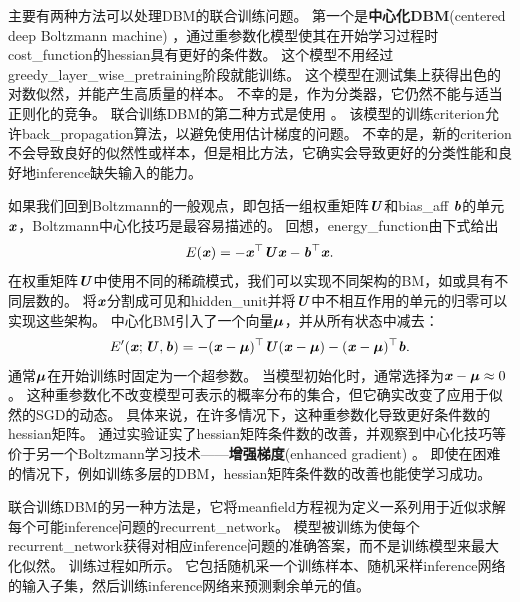 
主要有两种方法可以处理\gls{DBM}的联合训练问题。
第一个是\textbf{中心化\gls{DBM}}(centered deep Boltzmann machine) \citep{Montavon2012}，通过重参数化模型使其在开始学习过程时\gls{cost_function}的\gls{hessian}具有更好的条件数。
这个模型不用经过\gls{greedy_layer_wise_pretraining}阶段就能训练。
这个模型在测试集上获得出色的对数似然，并能产生高质量的样本。
不幸的是，作为分类器，它仍然不能与适当正则化的竞争。
联合训练\gls{DBM}的第二种方式是使用 \citep{Goodfellow-et-al-NIPS2013}。
该模型的训练\gls{criterion}允许\gls{back_propagation}算法，以避免使用估计梯度的问题。
不幸的是，新的\gls{criterion}不会导致良好的似然性或样本，但是相比方法，它确实会导致更好的分类性能和良好地\gls{inference}缺失输入的能力。

如果我们回到\gls{Boltzmann}的一般观点，即包括一组权重矩阵$\boldsymbol{\mathit{U}}$和\gls{bias_aff} $\boldsymbol{\mathit{b}}$的单元$\boldsymbol{\mathit{x}}$，\gls{Boltzmann}中心化技巧是最容易描述的。
回想，\gls{energy_function}由下式给出
\begin{align}
 E(\boldsymbol{\mathit{x}}) = -\boldsymbol{\mathit{x}}^\top \boldsymbol{\mathit{U}} \boldsymbol{\mathit{x}} - \boldsymbol{\mathit{b}}^\top \boldsymbol{\mathit{x}}.
\end{align}
在权重矩阵$\boldsymbol{\mathit{U}}$中使用不同的稀疏模式，我们可以实现不同架构的\gls{BM}，如或具有不同层数的。
将$\boldsymbol{\mathit{x}}$分割成可见和\gls{hidden_unit}并将$\boldsymbol{\mathit{U}}$中不相互作用的单元的归零可以实现这些架构。
中心化\gls{BM}引入了一个向量$\boldsymbol{\mu}$，并从所有状态中减去：
\begin{align}
    E^{\prime}(\boldsymbol{\mathit{x}}; \boldsymbol{\mathit{U}}, \boldsymbol{\mathit{b}}) = -(\boldsymbol{\mathit{x}} - \boldsymbol{\mu})^\top \boldsymbol{\mathit{U}} (\boldsymbol{\mathit{x}} - \boldsymbol{\mu}) - (\boldsymbol{\mathit{x}} - \boldsymbol{\mu})^\top \boldsymbol{\mathit{b}}.
\end{align}
通常$\boldsymbol{\mu}$在开始训练时固定为一个超参数。
当模型初始化时，通常选择为$\boldsymbol{\mathit{x}} - \boldsymbol{\mu} \approx 0$。
这种重参数化不改变模型可表示的概率分布的集合，但它确实改变了应用于似然的\gls{SGD}的动态。
具体来说，在许多情况下，这种重参数化导致更好条件数的\gls{hessian}矩阵。
\citet{melchior2013center}通过实验证实了\gls{hessian}矩阵条件数的改善，并观察到中心化技巧等价于另一个\gls{Boltzmann}学习技术——\textbf{增强梯度}(enhanced gradient) \citep{ICML2011Cho_98-small}。
即使在困难的情况下，例如训练多层的\gls{DBM}，\gls{hessian}矩阵条件数的改善也能使学习成功。


联合训练\gls{DBM}的另一种方法是，它将\gls{meanfield}方程视为定义一系列用于近似求解每个可能\gls{inference}问题的\gls{recurrent_network}\citep{Goodfellow-et-al-NIPS2013}。
模型被训练为使每个\gls{recurrent_network}获得对相应\gls{inference}问题的准确答案，而不是训练模型来最大化似然。
训练过程如所示。
它包括随机采一个训练样本、随机采样\gls{inference}网络的输入子集，然后训练\gls{inference}网络来预测剩余单元的值。

